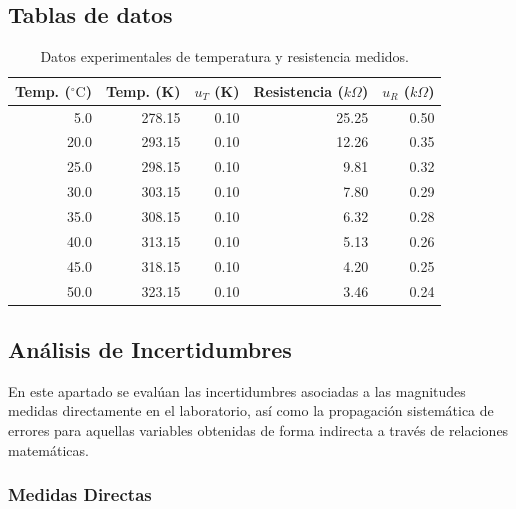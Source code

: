 \documentclass[11pt,a4paper]{article}
\begin{document}
\subsection{Tablas de datos}

\begin{table}[ht!]
    \centering
    \begin{tabular}{r r r r r}
    \toprule
    {Temp. ($^{\circ}\mathrm{C}$)} & {Temp. (K)} & {$u_T$ (K)} & {Resistencia ($k\Omega$)} & {$u_R$ ($k\Omega$)} \\
    \midrule
    5.0 & 278.15 & 0.10 & 25.25 & 0.50 \\
    20.0 & 293.15 & 0.10 & 12.26 & 0.35 \\
    25.0 & 298.15 & 0.10 & 9.81 & 0.32 \\
    30.0 & 303.15 & 0.10 & 7.80 & 0.29 \\
    35.0 & 308.15 & 0.10 & 6.32 & 0.28 \\
    40.0 & 313.15 & 0.10 & 5.13 & 0.26 \\
    45.0 & 318.15 & 0.10 & 4.20 & 0.25 \\
    50.0 & 323.15 & 0.10 & 3.46 & 0.24 \\
    \bottomrule
    \end{tabular}
    \caption{Datos experimentales de temperatura y resistencia medidos.}
    \label{tab:datos_experimentales}
\end{table}
\FloatBarrier

\subsection{Análisis de Incertidumbres}

En este apartado se evalúan las incertidumbres asociadas a las magnitudes medidas directamente en el laboratorio, así como la propagación sistemática de errores para aquellas variables obtenidas de forma indirecta a través de relaciones matemáticas.

\subsubsection{Medidas Directas}
\end{document}
